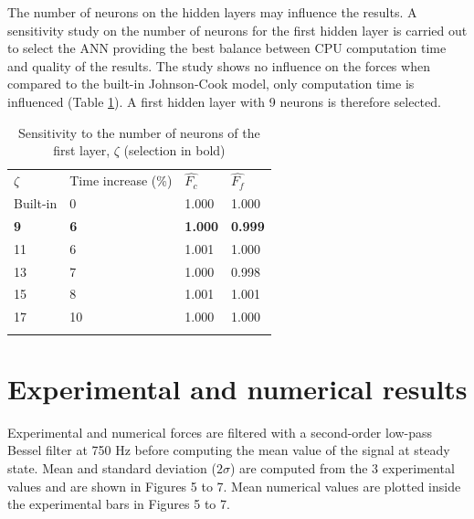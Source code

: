 \documentclass[final,5p,times,twocolumn]{elsarticle}
\begin{document}
The number of neurons on the hidden layers may influence the results. A sensitivity study on the number of neurons for the first hidden layer is carried out to select the ANN providing the best balance between CPU computation time and quality of the results. The study shows no influence on the forces when compared to the built-in Johnson-Cook model, only computation time is influenced (Table \ref{tab:NbNeurons}). A first hidden layer with 9 neurons is therefore selected.

%
\begin{table}[!h]
\begin{center}
\caption{\label{tab:NbNeurons} Sensitivity to the number of neurons of the first layer, $\zeta$
(selection in bold)}
\begin{tabular}{llll}
\hline\noalign{\smallskip}
$\zeta$  & Time increase (\%) & $\hat{F_c}$ & $\hat{F_f}$\\
\noalign{\smallskip}\hline\noalign{\smallskip}
Built-in & 0 & 1.000 & 1.000\\
\textbf{9} & \textbf{6} & \textbf{1.000} & \textbf{0.999}\\
11 & 6 & 1.001 & 1.000\\
13 & 7 & 1.000 & 0.998\\
15 & 8 & 1.001 & 1.001\\
17 & 10 & 1.000 & 1.000\\
\noalign{\smallskip}\hline
\end{tabular}
\end{center}
\end{table}
%

\section{Experimental and numerical results}
\label{Results}

Experimental and numerical forces are filtered with a second-order low-pass Bessel filter at 750 Hz before computing the mean value of the signal at steady state. Mean and standard deviation ($2\sigma$) are computed from the 3 experimental values and are shown in Figures 5 to 7. Mean numerical values are plotted inside the experimental bars in Figures 5 to 7.
\end{document}
